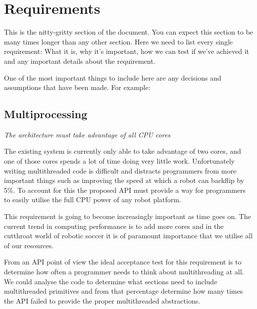 \documentclass[english,12pt]{scrartcl}
\newcommand{\requirement}[1]{\textit{#1}}
\begin{document}

    \section{Requirements}
        This is the nitty-gritty section of the document. You can expect this section to be many
        times longer than any other section. Here we need to list every single requirement: What it
        is, why it's important, how we can test if we've achieved it and any important details about
        the requirement.
        
        One of the most important things to include here are any decisions and assumptions that have
        been made. For example:
        
        \subsection{Multiprocessing}
            \requirement{The architecture must take advantage of all CPU cores}
            
            The existing system is currently only able to take advantage of two cores, and one of
            those cores spends a lot of time doing very little work. Unfortunately writing
            multithreaded code is difficult and distracts programmers from more important things
            such as improving the speed at which a robot can backflip by 5\%. To account for this
            the proposed API must provide a way for programmers to easily utilise the full CPU power
            of any robot platform.
            
            This requirement is going to become increasingly important as time goes on. The current
            trend in computing performance is to add more cores and in the cutthroat world of
            robotic soccer it is of paramount importance that we utilise all of our resources.
            
            From an API point of view the ideal acceptance test for this requirement is to determine 
            how often a programmer needs to think about multithreading at all. We could analyse the
            code to determine what sections need to include multithreaded primitives and from that
            percentage determine how many times the API failed to provide the proper multithreaded
            abstractions.
            
\end{document}

